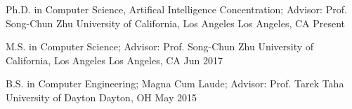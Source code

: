 


\begin{cventries}


\cventry
{Ph.D. in Computer Science, Artifical Intelligence Concentration; Advisor: Prof. Song-Chun Zhu}
{University of California, Los Angeles} %
{Los Angeles, CA} %
{Present} %
{ %
}
\vspace{-4mm}


\cventry
{M.S. in Computer Science; Advisor: Prof. Song-Chun Zhu}
{University of California, Los Angeles} %
{Los Angeles, CA} %
{Jun 2017} %
{ %
}
\vspace{-4mm}


\cventry
{B.S. in Computer Engineering; Magna Cum Laude; Advisor: Prof. Tarek Taha}
{University of Dayton} %
{Dayton, OH} %
{May 2015} %
{ %
}
\vspace{-4mm}


\end{cventries}
